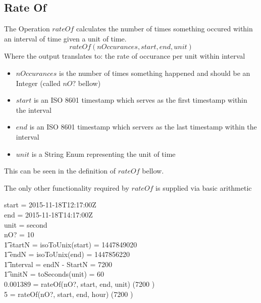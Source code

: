 \documentclass[../../main.tex]{subfiles}
\begin{document}
\subsection{Rate Of}
The Operation $rateOf$ calculates the number of times something occured
within an interval of time given a unit of time.
$$rateOf(nOccurances, start, end, unit)$$
Where the output translates to: the rate of occurance per unit within interval
\begin{itemize}
\item $nOccurances$ is the number of times something happened and should be an Integer (called $nO?$ bellow)
\item $start$ is an ISO 8601 timestamp which serves as the first timestamp within the interval
\item $end$ is an ISO 8601 timestamp which servers as the last timestamp within the interval
\item $unit$ is a String Enum representing the unit of time
\end{itemize}
This can be seen in the definition of $rateOf$ bellow.
The only other functionality required by $rateOf$ is supplied via basic arithmetic
\begin{argue}
  start = 2015-11-18T12:17:00Z \\
  end = 2015-11-18T14:17:00Z \\
  unit = second \\
  nO? = 10 \\
  \t1 startN = isoToUnix(start) = 1447849020 \\
  \t1 endN = isoToUnix(end) = 1447856220 \\
  \t1 interval = endN - StartN = 7200\\
  \t1 unitN = toSeconds(unit) = 60 \\
  0.001389 = rateOf(nO?, start, end, unit)  \div (7200 ) \\
  5 = rateOf(nO?, start, end, hour)  \div (7200 )
\end{argue}
\end{document}
